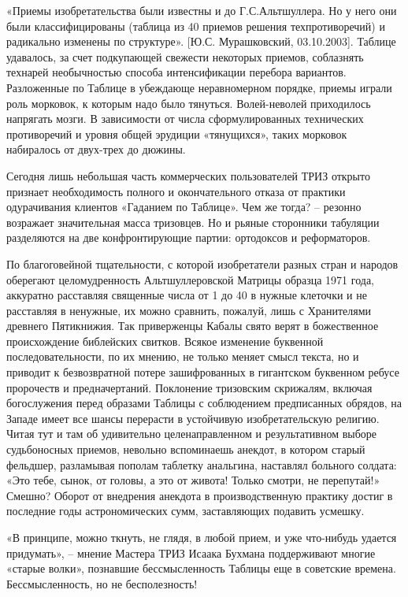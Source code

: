 \documentclass[11pt,a4paper]{article}
\begin{document}
«Приемы изобретательства были известны и до Г.С.Альтшуллера. Но у него они
были классифицированы (таблица из 40 приемов решения техпротиворечий) и
радикально изменены по структуре». [Ю.С. Мурашковский, 03.10.2003]. Таблице
удавалось, за счет подкупающей свежести некоторых приемов, соблазнять технарей
необычностью способа интенсификации перебора вариантов. Разложенные по Таблице
в убеждающе неравномерном порядке, приемы играли роль морковок, к которым надо
было тянуться. Волей-неволей приходилось напрягать мозги. В зависимости от
числа сформулированных технических противоречий и уровня общей эрудиции
«тянущихся», таких морковок набиралось от двух-трех до дюжины.

Сегодня лишь небольшая часть коммерческих пользователей ТРИЗ открыто признает
необходимость полного и окончательного отказа от практики одурачивания
клиентов «Гаданием по Таблице». Чем же тогда? -- резонно возражает
значительная масса тризовцев. Но и рьяные сторонники табуляции разделяются на
две конфронтирующие партии: ортодоксов и реформаторов.

По благоговейной тщательности, с которой изобретатели разных стран и народов
оберегают целомудренность Альтшуллеровской Матрицы образца 1971 года,
аккуратно расставляя священные числа от 1 до 40 в нужные клеточки и не
расставляя в ненужные, их можно сравнить, пожалуй, лишь с Хранителями древнего
Пятикнижия. Так приверженцы Кабалы свято верят в божественное происхождение
библейских свитков. Всякое изменение буквенной последовательности, по их
мнению, не только меняет смысл текста, но и приводит к безвозвратной потере
зашифрованных в гигантском буквенном ребусе пророчеств и
предначертаний. Поклонение тризовским скрижалям, включая богослужения перед
образами Таблицы с соблюдением предписанных обрядов, на Западе имеет все шансы
перерасти в устойчивую изобретательскую религию. Читая тут и там об
удивительно целенаправленном и результативном выборе судьбоносных приемов,
невольно вспоминаешь анекдот, в котором старый фельдшер, разламывая пополам
таблетку анальгина, наставлял больного солдата: «Это тебе, сынок, от головы, а
это от живота! Только смотри, не перепутай!» Смешно? Оборот от внедрения
анекдота в производственную практику достиг в последние годы астрономических
сумм, заставляющих подавить усмешку.

«В принципе, можно ткнуть, не глядя, в любой прием, и уже что-нибудь удается
придумать», -- мнение Мастера ТРИЗ Исаака Бухмана поддерживают многие «старые
волки», познавшие бессмысленность Таблицы еще в советские времена.
Бессмысленность, но не бесполезность!
\end{document}
